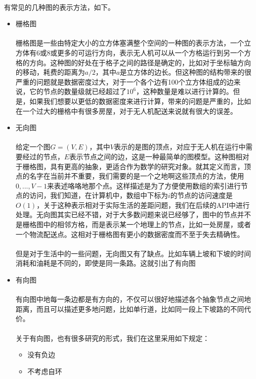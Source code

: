 \documentclass[UTF8,a4paper]{ctexart}
\begin{document}
\paragraph{}有常见的几种图的表示方法，如下。
\begin{itemize}
    \item 栅格图\label{grid}
          \paragraph{}
          栅格图是一些由特定大小的立方体塞满整个空间的一种图的表示方法，一个立方体有6或8或更多的可运行方向，表示无人机可以从一个方格运行到另一个方格的方向。这种图的好处在于格子之间的路径是确定的，比如对于坐标轴方向的移动，耗费的距离为$a/2$，其中$a$是立方体的边长。但这种图的结构带来的很严重的问题就是数据密度过大，对于一个各个边有100个立方体组成的边来说，它的节点的数量级就已经超过了$10^6$，这种数量是难以进行计算的。但是，如果我们想要以更低的数据密度来进行计算，带来的问题是严重的，比如在一个过大的栅格中有很多房屋，对于无人机配送来说就有很大的误差。~\cite{gridsgraph}
    \item 无向图
          \paragraph{}给定一个图$G=(V,E)$，其中$V$表示的是图的顶点，对应于无人机在运行中需要经过的节点，$E$表示节点之间的边，这是一种最简单的图模型。这种图相对于栅格图，具有更高的抽象，更适合作为数学的研究对象。就其定义而言，顶点的名字在当前并不重要，我们需要的是一个之地啊这些顶点的方法，使用$0,...,V-1$来表述咯咯地那个点。这样描述是为了方便使用数组的索引进行节点的访问，我们知道，在计算机中，数组中下标为$i$的节点的访问速度是$O(1)$，关于这种表示相对于实际生活的差距问题，我们在后续的API中进行处理。无向图其实已经不错，对于大多数问题来说已经够了，图中的节点并不是栅格图中的相邻方格，而是表示某一个地理上的节点，比如一处房屋，或者一个物流配送点。这相对于栅格图有更小的数据密度而不至于失去精确性。~\cite{introtoalgo}
          \paragraph{}
          但是对于生活中的一些问题，无向图又有了缺点。比如车辆上坡和下坡的时间消耗和油耗是不同的，即使是同一条路。这就引出了有向图
    \item 有向图
          \paragraph{}有向图中地每一条边都是有方向的，不仅可以很好地描述各个抽象节点之间地距离，而且可以描述更多地问题，比如单行道，比如同一段上下坡路的不同代价。
          \paragraph{}关于有向图，也有很多研究的形式，我们在这里采用如下规定：
          \begin{itemize}
              \item 没有负边
              \item 不考虑自环
          \end{itemize}
\end{itemize}
\end{document}
